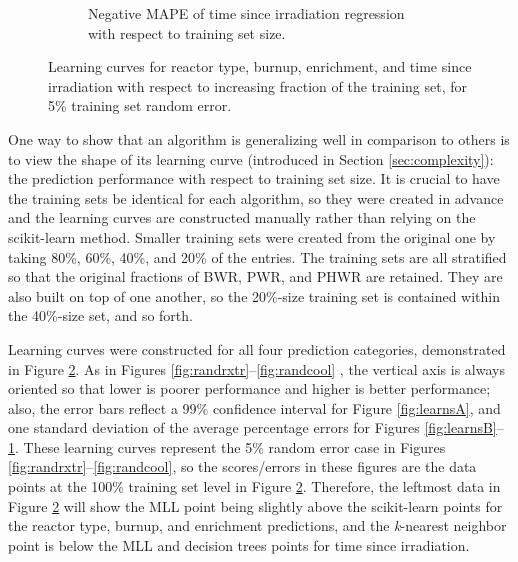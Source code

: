 \begin{figure}[!htb]
\begin{subfigure}[b]{0.50\textwidth}
    \caption{Negative \gls{MAPE} of time since irradiation regression with 
             respect to training set size.}
    \label{fig:learnsD}
  \end{subfigure}
  \caption[Learning curves for all four prediction parameters]
          {Learning curves for reactor type, burnup, enrichment, and time 
           since irradiation with respect to increasing fraction of the 
           training set, for 5\% training set random error.}
  \label{fig:learns}
\end{figure}

One way to show that an algorithm is generalizing well in comparison to others
is to view the shape of its learning curve (introduced in Section
\ref{sec:complexity}): the prediction performance with respect to training set
size.  It is crucial to have the training sets be identical for each algorithm,
so they were created in advance and the learning curves are constructed
manually rather than relying on the scikit-learn method.  Smaller training sets
were created from the original one by taking 80\%, 60\%, 40\%, and 20\% of the
entries. The training sets are all stratified so that the original fractions of
\gls{BWR}, \gls{PWR}, and \gls{PHWR} are retained. They are also built on top
of one another, so the 20\%-size training set is contained within the 40\%-size
set, and so forth.

Learning curves were constructed for all four prediction categories,
demonstrated in Figure \ref{fig:learns}. As in Figures
\ref{fig:randrxtr}--\ref{fig:randcool} , the vertical axis is always oriented
so that lower is poorer performance and higher is better performance; also, the
error bars reflect a 99\% confidence interval for Figure \ref{fig:learnsA}, and
one standard deviation of the average percentage errors for Figures
\ref{fig:learnsB}--\ref{fig:learnsD}.  These learning curves represent the 5\%
random error case in Figures \ref{fig:randrxtr}--\ref{fig:randcool}, so the
scores/errors in these figures are the data points at the 100\% training set
level in Figure \ref{fig:learns}.  Therefore, the leftmost data in Figure
\ref{fig:learns} will show the \gls{MLL} point being slightly above the
scikit-learn points for the reactor type, burnup, and enrichment predictions,
and the \textit{k}-nearest neighbor point is below the \gls{MLL} and decision
trees points for time since irradiation.  

